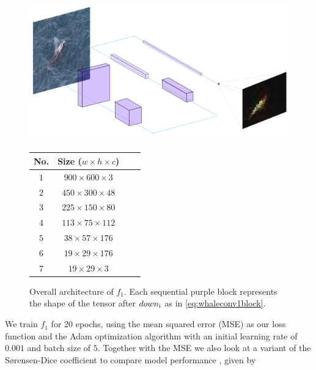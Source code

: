 \documentclass{IET}%
\begin{document}
\begin{figure}
\centering
\begin{minipage}[t]{.7\textwidth}
\centering
\vspace{0pt}
\centering
\includegraphics[width=\textwidth]{images/fcn/deconv2.png}
\label{fig:nn}
\caption{Overall architecture of $f_1$. Each sequential purple block represents the shape of the tensor after $down\textsubscript{i}$ as in \ref{eq:whaleconv1block}.}
\end{minipage}\hfill
\begin{minipage}[t]{.3\textwidth}
\centering
\vspace{40pt}
\begin{tabular}{cc|cc}
  No. & Size ($w\times h\times c$) &\\
    \hline
    \hline
    $1$ & $900 \times 600 \times 3$  & \\
    $2$ & $450 \times 300 \times 48$ &  \\
    $3$ & $225 \times 150 \times 80$ & \\ 
    $4$ & $113 \times 75 \times 112$ &\\
    $5$ & $38 \times 57 \times 176$ &\\
    $6$ &  $19 \times 29 \times 176$ &\\
    $7$ &  $19 \times 29 \times 3$ &\\
\end{tabular}
\end{minipage}
\end{figure}
We train $f_1$ for 20 epochs, using the mean squared error (MSE) as our loss function and the Adam optimization algorithm with an initial learning rate of $0.001$ and batch size of $5$. Together with the MSE we also look at a variant of the S{\o}rensen-Dice coefficient to compare model performance \cite{sorensen1948method}, given by
\end{document}
